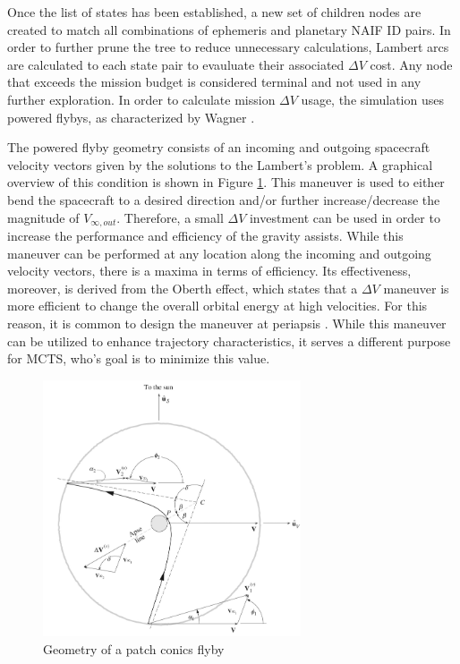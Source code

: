 \documentclass[letterpaper, preprint, paper,11pt]{AAS}	%
\begin{document}
Once the list of states has been established, a new set of children nodes are created to match all combinations of ephemeris and planetary NAIF ID pairs. In order to further prune the tree to reduce unnecessary calculations, Lambert arcs are calculated to each state pair to evauluate their associated $\Delta V$ cost. Any node that exceeds the mission budget is considered terminal and not used in any further exploration. In order to calculate mission $\Delta V$ usage, the simulation uses powered flybys, as characterized by Wagner \cite{Wagner2015}.

The powered flyby geometry consists of an incoming and outgoing spacecraft velocity vectors given by the solutions to the Lambert’s problem. A graphical overview of this condition is shown in Figure \ref*{fig:flyby}. This maneuver is used to either bend the spacecraft to a desired direction and/or further increase/decrease the magnitude of $V_{\infty, out}$. Therefore, a small $\Delta V$ investment can be used in order to increase the performance and efficiency of the gravity assists. While this maneuver can be performed at any location along the incoming and outgoing velocity vectors, there is a maxima in terms of efficiency. Its effectiveness, moreover, is derived from the Oberth effect, which states that a $\Delta V$ maneuver is more efficient to change the overall orbital energy at high velocities. For this reason, it is common to design the maneuver at periapsis \cite{Brennan2015}. While this maneuver can be utilized to enhance trajectory characteristics, it serves a different purpose for MCTS, who's goal is to minimize this value. 

\begin{figure}[h!tb]
    \centering
    \includegraphics[width=3in]{fig/flyby.png}
    \caption{Geometry of a patch conics flyby \cite{Curtis2013}}
    \label{fig:flyby}
\end{figure}
\end{document}
